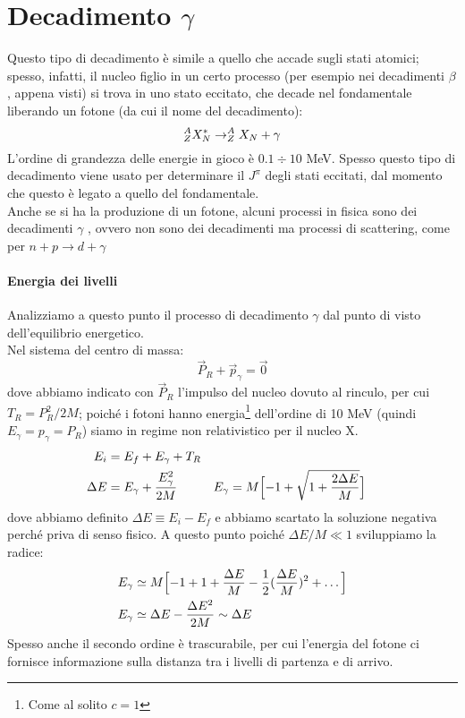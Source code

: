 \section{Decadimento $\gamma$}
Questo tipo di decadimento è simile a quello che accade sugli stati atomici; spesso, infatti, il nucleo figlio in un certo processo (per esempio nei decadimenti $\beta$, appena visti) si trova in uno stato eccitato, che decade nel fondamentale liberando un fotone (da cui il nome del decadimento):
$$\nuc{X}{A}{Z}{N}^* \to \nuc{X}{A}{Z}{N} + \gamma $$
L'ordine di grandezza delle energie in gioco è $0.1 \div 10$ MeV. Spesso questo tipo di decadimento viene usato per determinare il $J^\pi$ degli stati eccitati, dal momento che questo è legato a quello del fondamentale.\\
Anche se si ha la produzione di un fotone, alcuni processi in fisica sono dei decadimenti $\gamma$ , ovvero non sono dei decadimenti ma processi di scattering, come per $n+p\to d +\gamma$

\paragraph{Energia dei livelli} Analizziamo a questo punto il processo di decadimento $\gamma$ dal punto di visto dell'equilibrio energetico.\\
Nel sistema del centro di massa:
$$\vec{P}_R + \vec{p}_\gamma = \vec{0}$$
dove abbiamo indicato con $\vec{P}_R$ l'impulso del nucleo dovuto al rinculo, per cui $T_R = P_R^2/2M$; poiché i fotoni hanno energia\footnote{Come al solito $c=1$} dell'ordine di 10 MeV (quindi $E_\gamma=p_\gamma = P_R$) siamo in regime non relativistico per il nucleo X.
\begin{displaymath}
\begin{aligned}
E_i&=E_f + E_\gamma + T_R \\
\Delta E &= E_\gamma + \frac{E_\gamma^2}{2M} &
E_\gamma &= M\Bigl [ -1 + \sqrt{1+\frac{2\Delta E}{M}} \Bigr]
\end{aligned}
\end{displaymath}
dove abbiamo definito %
$\Delta E \equiv E_i-E_f$ e abbiamo scartato la soluzione negativa perché priva di senso fisico. A questo punto poiché $\Delta E /M \ll 1$ sviluppiamo la radice:
\begin{displaymath}
\begin{aligned}
E_\gamma &\simeq M\Bigl [ -1 + 1+ \frac{\Delta E}{M} -\frac{1}{2}(\frac{\Delta E}{M})^2 + \dots \Bigr] \\
E_\gamma &\simeq \Delta E - \frac{\Delta E^2}{2M} \sim \Delta E
\end{aligned}
\end{displaymath}
Spesso anche il secondo ordine è trascurabile, per cui l'energia del fotone ci fornisce informazione sulla distanza tra i livelli di partenza e di arrivo.

